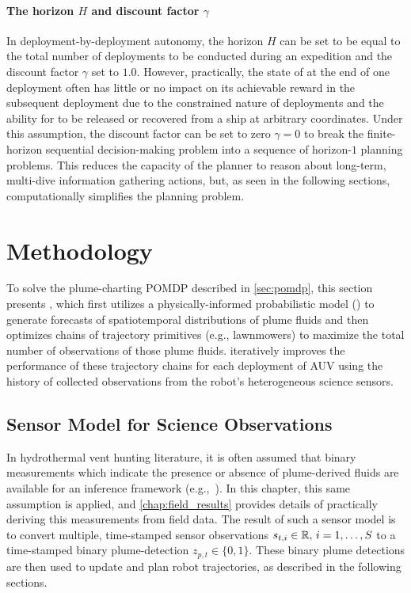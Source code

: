 \paragraph{The horizon $H$ and discount factor $\gamma$} In deployment-by-deployment autonomy, the horizon $H$ can be set to be equal to the total number of deployments to be conducted during an expedition and the discount factor $\gamma$ set to $1.0$. However, practically, the state of \Sentry at the end of one deployment often has little or no impact on its achievable reward in the subsequent deployment due to the constrained nature of deployments and the ability for \Sentry to be released or recovered from a ship at arbitrary coordinates. Under this assumption, the discount factor can be set to zero $\gamma=0$ to break the finite-horizon sequential decision-making problem into a sequence of horizon-$1$ planning problems. This reduces the capacity of the planner to reason about long-term, multi-dive information gathering actions, but, as seen in the following sections, computationally simplifies the planning problem.



\section{Methodology}
\label{sec:methods}
To solve the plume-charting POMDP described in \cref{sec:pomdp}, this section presents \PHORTEX, which first utilizes a physically-informed probabilistic model (\PHUMES) to generate forecasts of spatiotemporal distributions of plume fluids and then optimizes chains of trajectory primitives (e.g., lawnmowers) to maximize the total number of observations of those plume fluids. \PHORTEX iteratively improves the performance of these trajectory chains for each deployment of AUV \Sentry using the history of collected observations from the robot's heterogeneous science sensors.


\subsection{Sensor Model for Science Observations}
\label{sec:sensor_models}
In hydrothermal vent hunting literature, it is often assumed that binary measurements which indicate the presence or absence of plume-derived fluids are available for an inference framework (e.g.,~\cite{tian2014behavior,saigol2009information}). In this chapter, this same assumption is applied, and \cref{chap:field_results} provides details of practically deriving this measurements from field data. The result of such a sensor model is to convert multiple, time-stamped sensor observations $s_{t, i} \in \mathbb{R}, \, i = 1, \dots, S$ to a time-stamped binary plume-detection $z_{p, t} \in \{0, 1\}$. These binary plume detections are then used to update \PHUMES and plan robot trajectories, as described in the following sections. 

